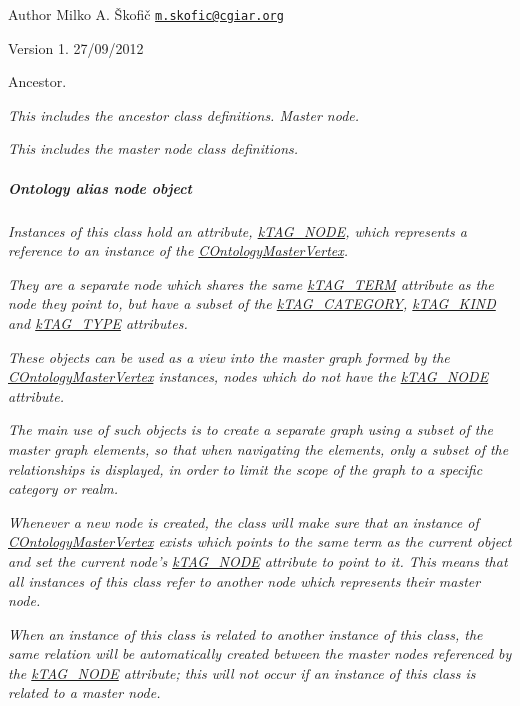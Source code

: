 {\itshape \begin{DoxyAuthor}{Author}
Milko A. Škofič \href{mailto:m.skofic@cgiar.org}{\tt m.\-skofic@cgiar.\-org} 
\end{DoxyAuthor}
\begin{DoxyVersion}{Version}
1. 27/09/2012
\end{DoxyVersion}
Ancestor.}

{\itshape This includes the ancestor class definitions. Master node.}

{\itshape This includes the master node class definitions. \subparagraph*{Ontology alias node object}}

{\itshape }

{\itshape Instances of this class hold an attribute, \hyperlink{}{k\-T\-A\-G\-\_\-\-N\-O\-D\-E}, which represents a reference to an instance of the \hyperlink{class_c_ontology_master_vertex}{C\-Ontology\-Master\-Vertex}.}

{\itshape They are a separate node which shares the same \hyperlink{}{k\-T\-A\-G\-\_\-\-T\-E\-R\-M} attribute as the node they point to, but have a subset of the \hyperlink{}{k\-T\-A\-G\-\_\-\-C\-A\-T\-E\-G\-O\-R\-Y}, \hyperlink{}{k\-T\-A\-G\-\_\-\-K\-I\-N\-D} and \hyperlink{}{k\-T\-A\-G\-\_\-\-T\-Y\-P\-E} attributes.}

{\itshape These objects can be used as a view into the master graph formed by the \hyperlink{class_c_ontology_master_vertex}{C\-Ontology\-Master\-Vertex} instances, nodes which do not have the \hyperlink{}{k\-T\-A\-G\-\_\-\-N\-O\-D\-E} attribute.}

{\itshape The main use of such objects is to create a separate graph using a subset of the master graph elements, so that when navigating the elements, only a subset of the relationships is displayed, in order to limit the scope of the graph to a specific category or realm.}

{\itshape Whenever a new node is created, the class will make sure that an instance of \hyperlink{class_c_ontology_master_vertex}{C\-Ontology\-Master\-Vertex} exists which points to the same term as the current object and set the current node's \hyperlink{}{k\-T\-A\-G\-\_\-\-N\-O\-D\-E} attribute to point to it. This means that all instances of this class refer to another node which represents their master node.}

{\itshape When an instance of this class is related to another instance of this class, the same relation will be automatically created between the master nodes referenced by the \hyperlink{}{k\-T\-A\-G\-\_\-\-N\-O\-D\-E} attribute; this will not occur if an instance of this class is related to a master node.}

